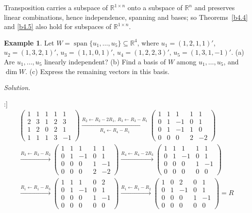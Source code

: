\documentclass[12pt]{article}
\newcommand{\R}{\mathbb R}
\DeclareMathOperator{\Span}{span}
\theoremstyle{definition}
\newtheorem{example}[theorem]{Example}
\begin{document}
Transposition carries a subspace of \(\R^{1\times n}\) onto a subspace of \(\R^n\) and preserves linear combinations,
hence independence, spanning and bases; so Theorems~\ref{b4.4} and \ref{b4.5} also hold for subspaces of
\(\R^{1\times n}\).

\begin{example}\label{b4.6}
Let \(W=\Span\{u_1,\dots,u_5\}\subseteq\R^4\), where \(u_1=(1,2,1,1)'\), \(u_2=(1,3,2,1)'\),
\(u_3=(1,1,0,1)'\), \(u_4=(1,2,2,3)'\), \(u_5=(1,3,1,-1)'\). (a) Are \(u_1,\dots,u_5\) linearly independent? (b) Find a basis of \(W\) among \(u_1,\dots,u_5\), and \(\dim W\).
(c) Express the remaining vectors in this basis.
\end{example}
\textit{Solution.}
\begin{board}[Row-reduce \(A=[u_1\ \cdots\ u_5]\):]
\[
\begin{gathered}
\begin{pmatrix}1&1&1&1&1\\2&3&1&2&3\\1&2&0&2&1\\1&1&1&3&-1\end{pmatrix}
\xrightarrow[R_4\leftarrow R_4-R_1]{R_2\leftarrow R_2-2R_1,\ R_3\leftarrow R_3-R_1}
\begin{pmatrix}1&1&1&1&1\\0&1&-1&0&1\\0&1&-1&1&0\\0&0&0&2&-2\end{pmatrix}
\\
\xrightarrow{R_3\leftarrow R_3-R_2}
\begin{pmatrix}1&1&1&1&1\\0&1&-1&0&1\\0&0&0&1&-1\\0&0&0&2&-2\end{pmatrix}
\xrightarrow{R_4\leftarrow R_4-2R_3}
\begin{pmatrix}1&1&1&1&1\\0&1&-1&0&1\\0&0&0&1&-1\\0&0&0&0&0\end{pmatrix}
\\
\xrightarrow{R_1\leftarrow R_1-R_3}
\begin{pmatrix}1&1&1&0&2\\0&1&-1&0&1\\0&0&0&1&-1\\0&0&0&0&0\end{pmatrix}
\xrightarrow{R_1\leftarrow R_1-R_2}
\begin{pmatrix}1&0&2&0&1\\0&1&-1&0&1\\0&0&0&1&-1\\0&0&0&0&0\end{pmatrix}=R
\end{gathered}
\]
\end{board}
\end{document}
